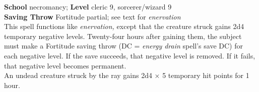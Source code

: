 \textbf{School} necromancy; \textbf{Level} cleric 9, sorcerer/wizard 9\\
\textbf{Saving Throw} Fortitude partial; see text for \textit{enervation}\\
This spell functions like \textit{enervation, }except that the creature struck gains 2d4 temporary negative levels. Twenty-four hours after gaining them, the subject must make a Fortitude saving throw (DC = \textit{energy drain }spell's save DC) for each negative level. If the save succeeds, that negative level is removed. If it fails, that negative level becomes permanent.\\
An undead creature struck by the ray gains 2d4 × 5 temporary hit points for 1 hour.\\
